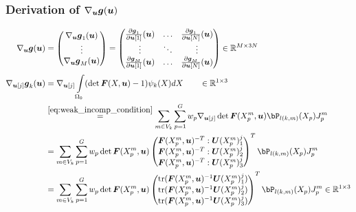 \subsubsection{Derivation of $\nabla_{\boldsymbol{u}}\boldsymbol{g}(\boldsymbol{u})$}
\begin{align*}
	\nabla_{\vu}\vg(\vu) &= \m{\nabla_{\vu}\vg_1(\vu)\\ \vdots \\ \nabla_{\vu}\vg_M(\vu)}
	 = \m{\d{\vg_1}{\vu[1]}(\vu) & \ldots & \d{\vg_1}{\vu[N]}(\vu)\\
	 	\vdots & \ddots & \vdots\\
	   \d{\vg_M}{\vu[1]}(\vu) & \ldots & \d{\vg_M}{\vu[N]}(\vu)} \in\R^{M \times 3N}\\
	\nabla_{\vu[j]}\vg_k(\vu) &= \nabla_{\vu[j]}\intor (\det\vF(X,\vu)-1)\psi_k(X)dX\qquad\in\R^{1\times 3}\\
		&\re{eq:weak_incomp_condition}  \sumvk\sumgp w_p \nabla_{\vu[j]}\det\vF(\pmp,\vu)\bPkmp\jmp\\
		&= \sumvk\sumgp w_p \det\vF(\pmp,\vu)\m{\vF(\pmp,\vu)^{-T}:\vU(\pmp)^j_1\\\vF(\pmp,\vu)^{-T}:\vU(\pmp)^j_2\\\vF(\pmp,\vu)^{-T}:\vU(\pmp)^j_3}^T\bPkmp\jmp\\
		&= \sumvk\sumgp w_p \det\vF(\pmp,\vu)\m{\tr(\vF(\pmp,\vu)^{-1}\vU(\pmp)^j_1)\\\tr(\vF(\pmp,\vu)^{-1}\vU(\pmp)^j_2)\\\tr(\vF(\pmp,\vu)^{-1}\vU(\pmp)^j_3)}^T\bPkmp\jmp\in\R^{1\times 3}
\end{align*}



